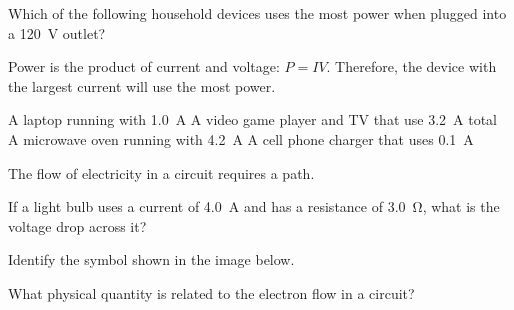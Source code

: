 \documentclass[answers]{exam}
\begin{document}
\begin{questions}
\question
Which of the following household devices uses the most power when plugged into a \SI{120}{V} outlet?

\begin{solution}
Power is the product of current and voltage: $P = IV$. Therefore, the device with the largest current will use the most power.
\end{solution}

\begin{randomizechoices}
    \choice A laptop running with \SI{1.0}{A}
    \choice A video game player and TV that use \SI{3.2}{A} total
    \correctchoice A microwave oven running with \SI{4.2}{A}
    \choice A cell phone charger that uses \SI{0.1}{A}
\end{randomizechoices}

\question
The flow of electricity in a circuit requires a  path.


\question
If a light bulb uses a current of \SI{4.0}{A} and has a resistance of \SI{3.0}{\ohm}, what is the voltage drop across it?

\fillin[\SI{12}{V}]


\question
Identify the symbol shown in the image below. \fillin[battery]

\begin{center}
\end{center}


\question
What physical quantity is related to the electron flow in a circuit? \fillin[current]


\end{questions}
\end{document}
